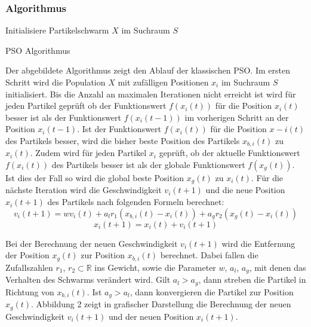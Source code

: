 \documentclass[a4paper, 11pt]{article}
\begin{document}
\subsubsection{Algorithmus}
\begin{framed}
	\begin{algorithm}[H]
		Initialisiere Partikelschwarm $X$ im Suchraum $S$\;
		\caption{\acs{PSO} Algorithmus}
		\label{psoalgo}
	\end{algorithm}
\end{framed}
Der abgebildete Algorithmus zeigt den Ablauf der klassischen \acs{PSO}. Im ersten Schritt wird die Population $X$ mit zufälligen Positionen $x_{i}$ im Suchraum $S$ initialisiert. Bis die Anzahl an maximalen Iterationen nicht erreicht ist wird für jeden Partikel geprüft ob der Funktionswert $f(x_{i}(t))$ für die Position $x_{i}(t)$ besser ist als der Funktionswert $f(x_{i}(t-1))$ im vorherigen Schritt an der Position $x_{i}(t-1)$. Ist der Funktionswert $f(x_{i}(t))$ für die Position $x-{i}(t)$ des Partikels besser, wird die bisher beste Position des Partikels $x_{b,i}(t)$ zu $x_{i}(t)$. Zudem wird für jeden Partikel $x_{i}$ geprüft, ob der aktuelle Funktionswert $f(x_{i}(t))$ des Partikels besser ist als der globale Funktionswert $f(x_{g}(t))$. Ist dies der Fall so wird die global beste Position $x_{g}(t)$ zu $x_{i}(t)$.  Für die nächste Iteration wird die Geschwindigkeit $v_{i}(t+1)$ und die neue Position $x_{i}(t+1)$ des Partikels nach folgenden Formeln berechnet:
\begin{equation}
v_{i}(t+1) = wv_{i}(t) + a_{l}r_{1}(x_{b,i}(t) - x_{i}(t)) + a_{g}r_{2}(x_{g}(t) - x_{i}(t))
\end{equation} 
\begin{equation}
x_{i}(t+1) = x_{i}(t) + v_{i}(t+1)
\end{equation}
\par Bei der Berechnung der neuen Geschwindigkeit $v_{i}(t+1)$ wird die Entfernung der Position  $x_{g}(t)$ zur Position $x_{b,i}(t)$ berechnet. Dabei fallen die Zufallszahlen $r_{1}$, $r_{2} \subset \mathbb{R}$ ins Gewicht, sowie die Parameter $w$, $a_{l}$, $a_{g}$, mit denen das Verhalten des Schwarms verändert wird. Gilt $a_{l} > a_{g}$, dann streben die Partikel in Richtung von $x_{b,i}(t)$. Ist $a_{g} > a_{l}$, dann konvergieren die Partikel zur Position $x_{g}(t)$. Abbildung 2 zeigt in grafischer Darstellung die Berechnung der neuen Geschwindigkeit $v_{i}(t+1)$ und der neuen Position $x_{i}(t+1)$.\newline
\end{document}
